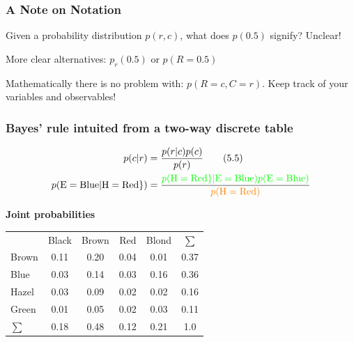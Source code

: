 \documentclass[usenames,dvipsnames,table]{beamer}
\newcommand{\cgy}{\cellcolor{gray!25}}
\newcommand{\cgr}{\cellcolor{green!25}}
\newcommand{\cye}{\cellcolor{orange!25}}
\begin{document}
\begin{frame}
\frametitle{A Note on Notation}
Given a probability distribution $p(r, c)$, what does $p(0.5)$ signify?
Unclear!

\vspace{1em}
More clear alternatives: $p_r(0.5)$ or $p(R=0.5)$

\vspace{1em}
Mathematically there is no problem with: $p(R=c, C=r)$. 
Keep track of your variables and observables!

\end{frame}

\begin{frame}
\frametitle{Bayes' rule intuited from a two-way discrete table}

\begin{align*}
p(c\vert r)  &= \frac{p(r\vert c) p(c)}{p(r)} \tag{5.5} \\
p(\mathrm{E}= \mathrm{Blue}|\mathrm{H}=\mathrm{Red}\})
&= \frac{\textcolor{green}{p(\mathrm{H}=\mathrm{Red}\}
                             |\textcolor{green}{\mathrm{E}=\mathrm{Blue}})
                             p(\mathrm{E}=\mathrm{Blue})}}
       {\textcolor{orange}{p(\mathrm{H}=\mathrm{Red})}}
\end{align*}

\textbf{Joint probabilities}
\begin{table}
\begin{tabular}{lccccc}
           & Black & Brown & Red  & Blond & $\sum$ \\
     Brown &\cgy0.11&\cgy0.20&\cye0.04&\cgy0.01& 0.37 \\
      Blue &\cgy0.03&\cgy0.14&\cgr0.03&\cgy0.16& 0.36 \\
     Hazel &\cgy0.03&\cgy0.09&\cye0.02&\cgy0.02& 0.16 \\
     Green &\cgy0.01&\cgy0.05&\cye0.02&\cgy0.03& 0.11 \\
    $\sum$ &  0.18 &  0.48 & 0.12 &  0.21 & 1.0   \\
\end{tabular}
\end{table}
\end{frame}
\end{document}
